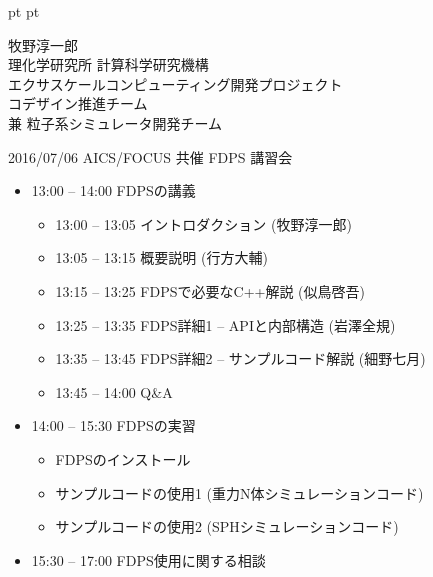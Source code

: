 \documentclass[12pt,dvipdfmx]{article}
\begin{document}
\LARGE

 pt
 pt

\date{}





{\large

\begin{center}
牧野淳一郎\\
理化学研究所 計算科学研究機構\\
エクサスケールコンピューティング開発プロジェクト\\
コデザイン推進チーム\\
兼 粒子系シミュレータ開発チーム

\leavevmode


\end{center}

}

\vfill

\hfill 2016/07/06 AICS/FOCUS 共催 FDPS 講習会



\begin{itemize}

\item 13:00 -- 14:00 FDPSの講義
  \begin{itemize}
  \item 13:00 -- 13:05 イントロダクション (牧野淳一郎)
  \item 13:05 -- 13:15 概要説明 (行方大輔)
  \item 13:15 -- 13:25 FDPSで必要なC++解説 (似鳥啓吾)
  \item 13:25 -- 13:35 FDPS詳細1 -- APIと内部構造 (岩澤全規)
  \item 13:35 -- 13:45 FDPS詳細2 -- サンプルコード解説 (細野七月)
  \item 13:45 -- 14:00 Q\&A
  \end{itemize}

\item 14:00 -- 15:30 FDPSの実習
  \begin{itemize}
  \item FDPSのインストール
  \item サンプルコードの使用1 (重力N体シミュレーションコード)
  \item サンプルコードの使用2 (SPHシミュレーションコード)
  \end{itemize}

\item 15:30 -- 17:00 FDPS使用に関する相談

\end{itemize}
\end{document}
